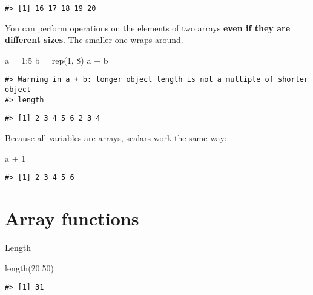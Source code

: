 \documentclass[
]{book}
\newenvironment{Shaded}{\begin{snugshade}}{\end{snugshade}}
\newcommand{\DecValTok}[1]{\textcolor[rgb]{0.00,0.00,0.81}{#1}}
\newcommand{\FunctionTok}[1]{\textcolor[rgb]{0.00,0.00,0.00}{#1}}
\newcommand{\NormalTok}[1]{#1}
\newcommand{\OtherTok}[1]{\textcolor[rgb]{0.56,0.35,0.01}{#1}}
\newcommand{\SpecialCharTok}[1]{\textcolor[rgb]{0.00,0.00,0.00}{#1}}
\begin{document}
\begin{verbatim}
#> [1] 16 17 18 19 20
\end{verbatim}

You can perform operations on the elements of two arrays \textbf{even if they are different sizes}. The smaller one wraps around.

\begin{Shaded}
\begin{Highlighting}[]
\NormalTok{a }\OtherTok{=} \DecValTok{1}\SpecialCharTok{:}\DecValTok{5}
\NormalTok{b }\OtherTok{=} \FunctionTok{rep}\NormalTok{(}\DecValTok{1}\NormalTok{, }\DecValTok{8}\NormalTok{)}
\NormalTok{a }\SpecialCharTok{+}\NormalTok{ b}
\end{Highlighting}
\end{Shaded}

\begin{verbatim}
#> Warning in a + b: longer object length is not a multiple of shorter object
#> length
\end{verbatim}

\begin{verbatim}
#> [1] 2 3 4 5 6 2 3 4
\end{verbatim}

Because all variables are arrays, scalars work the same way:

\begin{Shaded}
\begin{Highlighting}[]
\NormalTok{a }\SpecialCharTok{+} \DecValTok{1}
\end{Highlighting}
\end{Shaded}

\begin{verbatim}
#> [1] 2 3 4 5 6
\end{verbatim}

\hypertarget{array-functions}{%
\section{Array functions}\label{array-functions}}

Length

\begin{Shaded}
\begin{Highlighting}[]
\FunctionTok{length}\NormalTok{(}\DecValTok{20}\SpecialCharTok{:}\DecValTok{50}\NormalTok{)}
\end{Highlighting}
\end{Shaded}

\begin{verbatim}
#> [1] 31
\end{verbatim}
\end{document}
